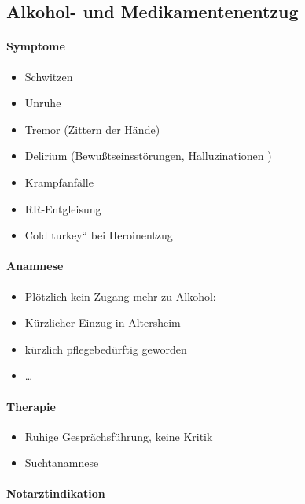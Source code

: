 \subsection{Alkohol- und Medikamentenentzug}


\paragraph{Symptome}

\begin{itemize}
    \item Schwitzen
    \item Unruhe
    \item Tremor  (Zittern der Hände)
    \item Delirium  (Bewu{\ss}tseinsstörungen, Halluzinationen )
    \item Krampfanfälle
    \item RR-Entgleisung
    \item {\quotedblbase}Cold turkey{\textquotedblleft} bei Heroinentzug
\end{itemize}


\paragraph{Anamnese}

\begin{itemize}
    \item Plötzlich kein Zugang mehr zu Alkohol:
    \item K\"urzlicher Einzug in Altersheim
    \item k\"urzlich pflegebed\"urftig geworden
    \item \ldots
\end{itemize}


\paragraph{Therapie}

\begin{itemize}
    \item Ruhige Gesprächsf\"uhrung, keine Kritik
    \item Suchtanamnese
\end{itemize}


\paragraph{Notarztindikation}

